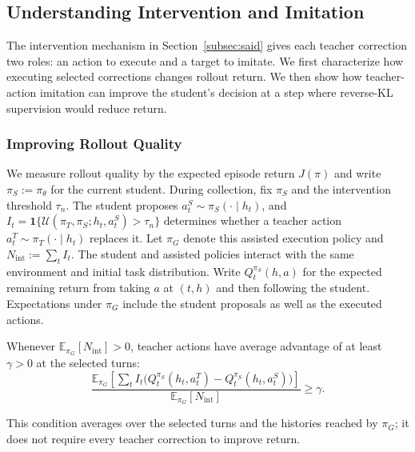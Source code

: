 \subsection{Understanding Intervention and Imitation}
\label{sec:theory}

The intervention mechanism in Section~\ref{subsec:said} gives each teacher correction two roles: an action to execute and a target to imitate. We first characterize how executing selected corrections changes rollout return. We then show how teacher-action imitation can improve the student's decision at a step where reverse-KL supervision would reduce return.

\subsubsection{Improving Rollout Quality}
\label{sec:theory_execution}

We measure rollout quality by the expected episode return $J(\pi)$ and write $\pi_S:=\pi_\theta$ for the current student. During collection, fix $\pi_S$ and the intervention threshold $\tau_n$. The student proposes $a_t^S\sim\pi_S(\cdot\mid h_t)$, and $I_t=\mathbf{1}\{\mathcal U(\pi_T,\pi_S;h_t,a_t^S)>\tau_n\}$ determines whether a teacher action $a_t^T\sim\pi_T(\cdot\mid h_t)$ replaces it. Let $\pi_G$ denote this assisted execution policy and $N_{\mathrm{int}}:=\sum_t I_t$. The student and assisted policies interact with the same environment and initial task distribution. Write $Q_t^{\pi_S}(h,a)$ for the expected remaining return from taking $a$ at $(t,h)$ and then following the student. Expectations under $\pi_G$ include the student proposals as well as the executed actions.

\begin{assumption}
\label{ass:average_recoverability}
Whenever $\mathbb E_{\pi_G}[N_{\mathrm{int}}]>0$, teacher actions have average advantage of at least $\gamma>0$ at the selected turns:
\begin{equation}
\frac{
\mathbb E_{\pi_G}\!\left[\sum_t I_t
\bigl(Q_t^{\pi_S}(h_t,a_t^T)-Q_t^{\pi_S}(h_t,a_t^S)\bigr)\right]
}{\mathbb E_{\pi_G}[N_{\mathrm{int}}]}
\ge \gamma.
\label{eq:average_recoverability}
\end{equation}
\end{assumption}

This condition averages over the selected turns and the histories reached by $\pi_G$; it does not require every teacher correction to improve return.

